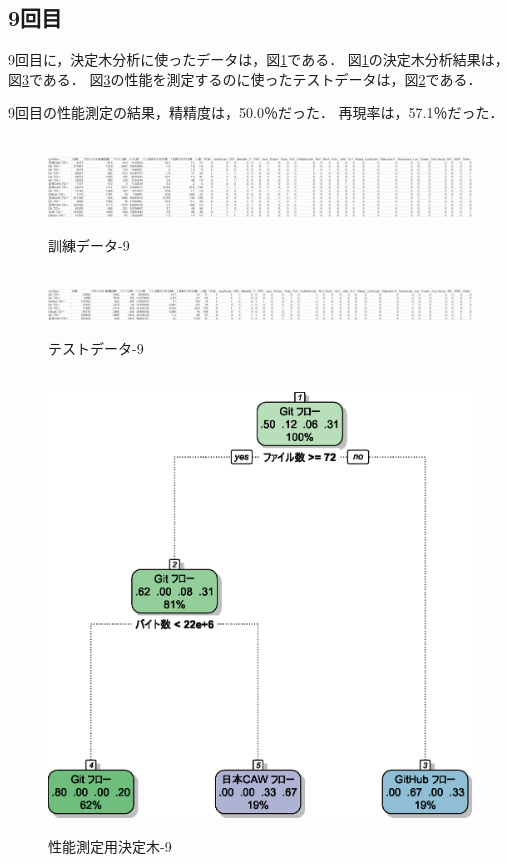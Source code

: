\subsection{9回目}
9回目に，決定木分析に使ったデータは，図\ref{データ9-1}である．
図\ref{データ9-1}の決定木分析結果は，図\ref{決定木9}である．
図\ref{決定木9}の性能を測定するのに使ったテストデータは，図\ref{データ9-2}である．

9回目の性能測定の結果，精精度は，50.0％だった．
再現率は，57.1％だった．

\begin{figure}[H]
\centering　
\includegraphics[width=13cm]{9-1.png}
\caption{訓練データ-9}\label{データ9-1}
\end{figure}
\begin{figure}[H]
\centering　
\includegraphics[width=13cm]{9-2.png}
\caption{テストデータ-9}\label{データ9-2}
\end{figure}
\begin{figure}[H]
\centering　
\includegraphics[width=13cm]{9.eps}
\caption{性能測定用決定木-9}\label{決定木9}
\end{figure}


